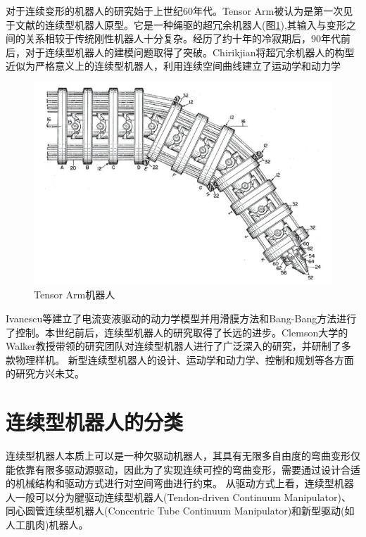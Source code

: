对于连续变形的机器人的研究始于上世纪60年代。Tensor Arm被认为是第一次见于文献的连续型机器人原型\cite{anderson_tensor_1967}。它是一种绳驱的超冗余机器人(图\ref{fig:tensor_arm}),其输入与变形之间的关系相较于传统刚性机器人十分复杂。经历了约十年的冷寂期后，90年代前后，对于连续型机器人的建模问题取得了突破。Chirikjian将超冗余机器人的构型近似为严格意义上的连续型机器人，利用连续空间曲线建立了运动学和动力学\cite{chirikjian_hyper-redundant_1994}
\begin{figure}
	\centering
	\includegraphics[width=.75\textwidth]{figures/tensor_arm.png}
	\caption{Tensor Arm机器人}
	\label{fig:tensor_arm}
\end{figure}
Ivanescu等建立了电流变液驱动的动力学模型并用滑膜方法和Bang-Bang方法进行了控制\cite{ivanescu_variable_1995}。本世纪前后，连续型机器人的研究取得了长远的进步。Clemson大学的Walker教授带领的研究团队对连续型机器人进行了广泛深入的研究，并研制了多款物理样机\cite{hannan_analysis_2001,gravagne_manipulability_2002,mcmahan_field_2006,walker_robot_2013,tonapi_next_2014,tonapi_novel_2015}。
新型连续型机器人的设计\cite{yigit_design_2017,conrad_interleaved_2017,qi_novel_2016}、运动学和动力学\cite{chikhaoui_kinematics_2016,godage_dynamics_2016}、控制和规划\cite{chikhaoui_kinematics_2016}等各方面的研究方兴未艾。

\section{连续型机器人的分类}

连续型机器人本质上可以是一种欠驱动机器人，其具有无限多自由度的弯曲变形仅能依靠有限多驱动源驱动，因此为了实现连续可控的弯曲变形，需要通过设计合适的机械结构和驱动方式进行对空间弯曲进行约束。
从驱动方式上看，连续型机器人一般可以分为腱驱动连续型机器人(Tendon-driven Continuum Manipulator)、同心圆管连续型机器人(Concentric Tube Continuum Manipulator)和新型驱动(如人工肌肉)机器人。
